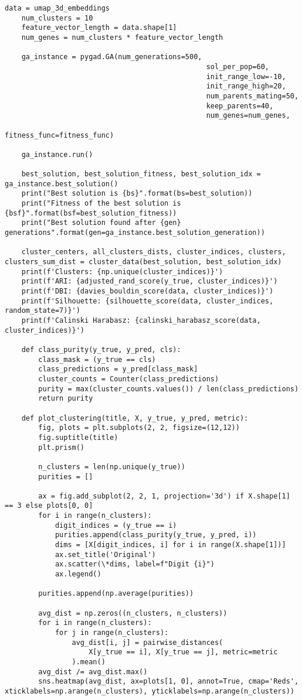 \begin{lstlisting}[label=lst:1,caption=Кластеризация с использованием генетического алгоритма]
	data = umap_3d_embeddings
	num_clusters = 10
	feature_vector_length = data.shape[1]
	num_genes = num_clusters * feature_vector_length
	
	ga_instance = pygad.GA(num_generations=500,
												sol_per_pop=60,
												init_range_low=-10,
												init_range_high=20,
												num_parents_mating=50,
												keep_parents=40,
												num_genes=num_genes,
												fitness_func=fitness_func)
	
	ga_instance.run()
	
	best_solution, best_solution_fitness, best_solution_idx = ga_instance.best_solution()
	print("Best solution is {bs}".format(bs=best_solution))
	print("Fitness of the best solution is {bsf}".format(bsf=best_solution_fitness))
	print("Best solution found after {gen} generations".format(gen=ga_instance.best_solution_generation))
	
	cluster_centers, all_clusters_dists, cluster_indices, clusters, clusters_sum_dist = cluster_data(best_solution, best_solution_idx)
	print(f'Clusters: {np.unique(cluster_indices)}')
	print(f'ARI: {adjusted_rand_score(y_true, cluster_indices)}')
	print(f'DBI: {davies_bouldin_score(data, cluster_indices)}')
	print(f'Silhouette: {silhouette_score(data, cluster_indices, random_state=7)}')
	print(f'Calinski Harabasz: {calinski_harabasz_score(data, cluster_indices)}')
	
	def class_purity(y_true, y_pred, cls):
		class_mask = (y_true == cls)
		class_predictions = y_pred[class_mask]
		cluster_counts = Counter(class_predictions)
		purity = max(cluster_counts.values()) / len(class_predictions)
		return purity
	
	def plot_clustering(title, X, y_true, y_pred, metric):
		fig, plots = plt.subplots(2, 2, figsize=(12,12))
		fig.suptitle(title)
		plt.prism()
		
		n_clusters = len(np.unique(y_true))
		purities = []
		
		ax = fig.add_subplot(2, 2, 1, projection='3d') if X.shape[1] == 3 else plots[0, 0]
		for i in range(n_clusters):
			digit_indices = (y_true == i)
			purities.append(class_purity(y_true, y_pred, i))
			dims = [X[digit_indices, i] for i in range(X.shape[1])]
			ax.set_title('Original')
			ax.scatter(\*dims, label=f"Digit {i}")
			ax.legend()
		
		purities.append(np.average(purities))
		
		avg_dist = np.zeros((n_clusters, n_clusters))
		for i in range(n_clusters):
			for j in range(n_clusters):
				avg_dist[i, j] = pairwise_distances(
					X[y_true == i], X[y_true == j], metric=metric
				).mean()
		avg_dist /= avg_dist.max()
		sns.heatmap(avg_dist, ax=plots[1, 0], annot=True, cmap='Reds', xticklabels=np.arange(n_clusters), yticklabels=np.arange(n_clusters))
		

\end{lstlisting}

